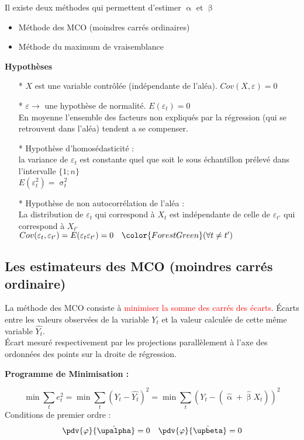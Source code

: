\documentclass{article}
\begin{document}
Il existe deux méthodes qui permettent d'estimer \(\upalpha \textrm{ et } \upbeta\)
\begin{itemize}
    \item Méthode des MCO (moindres carrés ordinaires)
    \item Méthode du maximum de vraisemblance
\end{itemize}
\begin{center}
    \textbf{Hypothèses}
\end{center}
\begin{itemize}
	\item[*] \(X\) est une variable contrôlée (indépendante de l'aléa). \(Cov(X,\varepsilon) = 0\)
    \item[*] $\varepsilon \rightarrow$ une hypothèse de normalité. $E(\varepsilon_t) = 0$ \\
    En moyenne l'ensemble des facteurs non expliqués par la régression (qui se retrouvent dans l'aléa) tendent a se compenser.
    \item[*] Hypothèse d'homosédasticité : 
    \\la variance de $\varepsilon_t$ est constante quel que soit le sous échantillon prélevé dans l'intervalle $\{1;n\}$ \\
    $E(\varepsilon_t^2) = \upsigma_t^2$
    \item[*] Hypothèse de non autocorrélation de l'aléa :\\
    La distribution de $\varepsilon_t$ qui correspond à $X_t$ est indépendante de celle de $\varepsilon_{t'}$ qui correspond à $X_{t'}$\\
    $Cov(\varepsilon_t,\varepsilon_{t'}) = E(\varepsilon_t \varepsilon_{t'}) = 0 \quad \color{ForestGreen}(\forall t \neq t')$
\end{itemize}
\newpage

\subsection{Les estimateurs des MCO (moindres carrés ordinaire)}
La méthode des MCO consiste à \textcolor{red}{minimiser la somme des carrés des écarts}. Écarts entre les valeurs observées de la variable \(Y_t\) et la valeur calculée de cette même variable \(\hat{Y_t}\). \\ 
Écart mesuré respectivement par les projections parallèlement à l'axe des ordonnées des points sur la droite de régression. \\
\begin{center}
	\textbf{Programme de Minimisation :}
\end{center}
\begin{equation*}
	\min \sum_t e^2_t = \min \sum_t ( Y_t - \hat{Y_t})^2 = \min \sum_t (Y_t - (\hat{\upalpha} + \hat{\upbeta} X_t))^2
\end{equation*}
Conditions de premier ordre :
\begin{align*}
	\pdv{\varphi}{\hat{\upalpha}} &= 0 &\pdv{\varphi}{\hat{\upbeta}} = 0
\end{align*}
\end{document}
